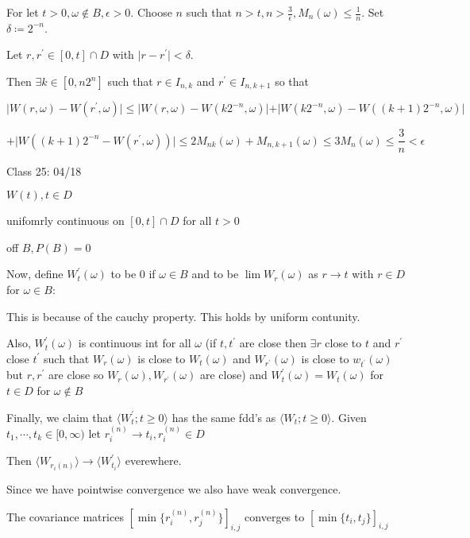 \documentclass{article}
\theoremstyle{definition}
\begin{document}
For let \(t > 0, \omega \not\in B, \epsilon > 0.\) Choose \(n\) such that \(n > t, n > \frac{3}{\epsilon}, M_n(\omega)\leq \frac{1}{n}\). Set \(\delta \coloneqq 2^{-n}\).

Let \(r, r^{\prime} \in [0,t]\cap D\) with \(\vert r - r^{\prime} \vert < \delta \).

Then \(\exists k \in [0, n2^n]\) such that \(r\in I_{n,k}\) and \(r^{\prime} \in I_{n,k+1}\) so that

\[
    \vert W(r,\omega) - W(r^{\prime}, \omega) \vert \leq \vert W(r, \omega) - W(k 2^{-n}, \omega) \vert + \vert W(k 2^{-n}, \omega) - W((k+1)2^{-n}, \omega) \vert 
\]

\[
    + \vert W((k+1)2^{-n}-W(r^{\prime} ,\omega)) \vert \leq 2 M_{n k}(\omega) + M_{n,k+1}(\omega) \leq 3 M_n(\omega) \leq \frac{3}{n} < \epsilon
\]

\hrulefill

Class 25: 04/18

\(W(t), t\in D\)

unifomrly continuous on \([0,t]\cap D\) for all \(t > 0\) 

off \(B, P(B) = 0\) 

Now, define \(W_t^{\prime} (\omega)\) to be \(0\) if \(\omega \in B\) and to be \(\lim W_r(\omega)\) as \(r \to t\) with \(r\in D\) for \(\omega \in B\):

This is because of the cauchy property. This holds by uniform contunity.

Also, \(W_t^{\prime} (\omega)\) is continuous int for all \(\omega\) (if \(t,t^{\prime}\) are close then \(\exists r\) close to \(t\) and \(r^{\prime}\) close \(t^{\prime}\) such that \(W_r(\omega)\) is close to \(W_t(\omega)\) and \(W_{r^{\prime}}(\omega)\) is close to \(w_{t^{\prime}}(\omega)\) but \(r,r^{\prime}\) are close so \(W_r(\omega), W_{r^{\prime}}(\omega)\) are close) and \(W_t^{\prime} (\omega) = W_t(\omega)\) for \(t\in D\) for \(\omega \notin B\)

Finally, we claim that \(\langle W_t^{\prime} ; t \geq 0\rangle\) has the same fdd's as \(\langle W_t ; t \geq 0 \rangle \). Given \(t_1,\cdots,t_k\in [0,\infty )\) let \(r_i^{(n)} \to t_i, r_i^{(n)}\in D\) 

Then \(\langle W_{r_i(n)} \rangle \to \langle W_{t_i}^{\prime}  \rangle \) everewhere.

Since we have pointwise convergence we also have weak convergence.

The covariance matrices \([\min \{ r_i^{(n)}, r_j^{(n)} \} ]_{i,j}\) converges to \([\min \{ t_i, t_j \} ]_{i,j}\) 
\end{document}
